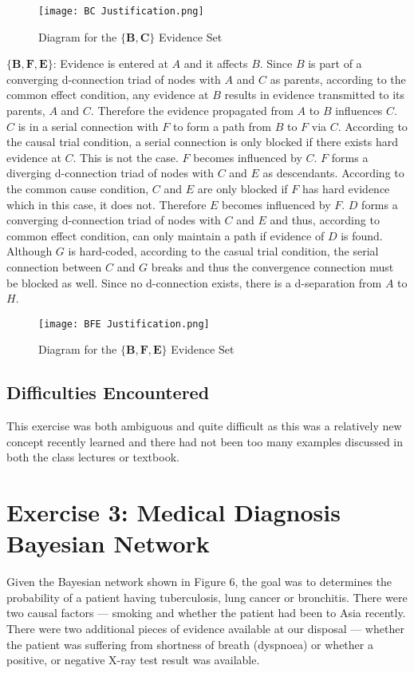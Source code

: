 \documentclass[11pt]{article}
\newcommand{\forceindent}{\leavevmode{\parindent=1em\indent}}
\begin{document}
\begin{figure}[h!]
  \centering
{\texttt{[image: BC Justification.png]}}
    \caption{Diagram for the $\mathbf{\{B,C\}}$ Evidence Set }
\end{figure}

\noindent $\mathbf{\{B,F,E\}}$: Evidence is entered at $A$ and it affects $B$. Since $B$ is part of a converging d-connection triad of nodes with $A$ and $C$ as parents, according to the common effect condition, any evidence at $B$ results in evidence transmitted to its parents, $A$ and $C$. Therefore the evidence propagated from $A$ to $B$ influences $C$. $C$ is in a serial connection with $F$ to form a path from $B$ to $F$ via $C$. According to the causal trial condition, a serial connection is only blocked if there exists hard evidence at $C$. This is not the case. $F$ becomes influenced by $C$. $F$ forms a diverging d-connection triad of nodes with $C$ and $E$ as descendants. According to the common cause condition, $C$ and $E$ are only blocked if $F$ has hard evidence which in this case, it does not. Therefore $E$ becomes influenced by $F$. $D$ forms a converging d-connection triad of nodes with $C$ and $E$ and thus, according to common effect condition, can only maintain a path if evidence of $D$ is found. Although $G$ is hard-coded, according to the casual trial condition, the serial connection between $C$ and $G$ breaks and thus the convergence connection must be blocked as well. Since no d-connection exists, there is a d-separation from $A$ to $H$.  

\begin{figure}[h!]
  \centering
{\texttt{[image: BFE Justification.png]}}
    \caption{Diagram for the $\mathbf{\{B,F,E\}}$ Evidence Set }
\end{figure}
\vspace{-0.5cm}
\subsection{Difficulties Encountered}
\forceindent This exercise was both ambiguous and quite difficult as this was a relatively new concept recently learned and there had not been too many examples discussed in both the class lectures or textbook.

\section{Exercise 3: Medical Diagnosis Bayesian Network}
\forceindent Given the Bayesian network shown in Figure 6, the goal was to determines the probability of a patient having tuberculosis, lung cancer or bronchitis. There were two causal factors --- smoking and whether the patient had been to Asia recently. There were two additional pieces of evidence available at our disposal --- whether the patient was suffering from shortness of breath (dyspnoea) or whether a positive, or negative X-ray test result was available.\\
\end{document}

